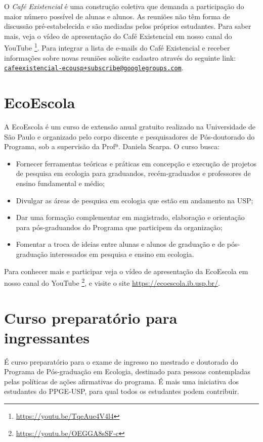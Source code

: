 O \emph{Café Existencial} é uma construção coletiva que demanda a
participação do maior número possível de alunas e alunos. As reuniões
não têm forma de discussão pré-estabelecida e são mediadas pelos
próprios estudantes. Para saber mais, veja o vídeo de apresentação do
Café Existencial em nosso canal do YouTube
\footnote{\url{https://youtu.be/TqeAue4V4l4}}. Para integrar a lista
de e-mails do Café Existencial e receber informações sobre novas
reuniões solicite cadastro através do seguinte link:
\href{mailto:cafeexistencial-ecousp+subscribe@googlegroups.com}{\nolinkurl{cafeexistencial-ecousp+subscribe@googlegroups.com}}.

\section{EcoEscola}
\label{ecoescola}

A EcoEscola é um curso de extensão anual gratuito realizado na
Universidade de São Paulo e organizado pelo corpo discente e
pesquisadores de Pós-doutorado do Programa, sob a supervisão da
Profª. Daniela Scarpa. O curso busca:

\begin{itemize}
\item Fornecer ferramentas teóricas e práticas em concepção e execução
  de projetos de pesquisa em ecologia para graduandos, recém-graduados
  e professores de ensino fundamental e médio;
\item Divulgar as áreas de pesquisa em ecologia que estão em andamento
  na USP;
\item Dar uma formação complementar em magistrado, elaboração e
  orientação para pós-graduandos do Programa que participem da
  organização;
\item Fomentar a troca de ideias entre alunas e alunos de graduação e
  de pós-graduação interessados em pesquisa e ensino em ecologia.
\end{itemize}

Para conhecer mais e participar veja o vídeo de apresentação da
EcoEscola em nosso canal do YouTube
\footnote{\url{https://youtu.be/OEGGA8sSF-c}}, e visite o site 
\url{https://ecoescola.ib.usp.br/}.

\section{Curso preparatório para ingressantes}
É curso preparatório para o exame de ingresso no mestrado e doutorado
do Programa de Pós-graduação em Ecologia, destinado para pessoas
contempladas pelas políticas de ações afirmativas do programa. É mais
uma iniciativa dos estudantes do PPGE-USP, para qual todos os estudantes
podem contribuir.

